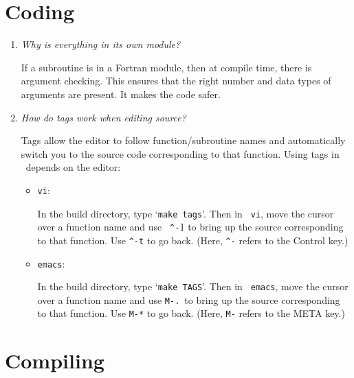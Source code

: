 \section{Coding}

\begin{enumerate}

\item {\em Why is everything in its own module?}

   If a subroutine is in a Fortran module, then at compile time, 
   there is argument checking.  This ensures that the right number
   and data types of arguments are present.  It makes the code safer.



\item {\em How do tags work when editing source?}

   Tags allow the editor to follow function/subroutine names and
   automatically switch you to the source code corresponding to that
   function.  Using tags in \maestro\ depends on the editor:

   \begin{itemize}

     \item {\tt vi}:

     In the build directory, type `{\tt make tags}'.  Then in {\tt
       vi}, move the cursor over a function name and use {\tt
       \verb|^|-]} to bring up the source corresponding to that
       function.  Use {\tt \verb|^|-t} to go back.  (Here, {\tt \verb|^|-}
       refers to the Control key.)

     \item {\tt emacs}:

     In the build directory, type `{\tt make TAGS}'.  Then in {\tt
       emacs}, move the cursor over a function name and use {\tt M-.}\
       to bring up the source corresponding to that function.  Use
       {\tt M-*} to go back.  (Here, {\tt M-} refers to the META key.)

   \end{itemize}

\end{enumerate}


\section{Compiling}

